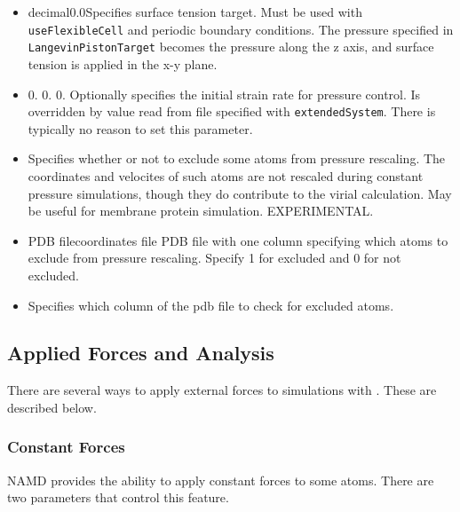 \begin{itemize}
\item
{}
{decimal}{0.0}{Specifies surface tension target.  Must be used with 
{\tt useFlexibleCell} and periodic boundary conditions.  The pressure 
specified in {\tt LangevinPistonTarget} becomes the pressure along the z
axis, and surface tension is applied in the x-y plane.}

\item
{}
{0. 0. 0.}
{Optionally specifies the initial strain rate for pressure control.
Is overridden by value read from file specified with {\tt extendedSystem}.
There is typically no reason to set this parameter.}

\item
{}
{Specifies whether or not to exclude some atoms from pressure rescaling.  The
coordinates and velocites of such atoms are not rescaled during constant
pressure simulations, though they do contribute to the virial calculation. 
May be useful for membrane protein simulation.  EXPERIMENTAL.}

\item
{}
{PDB file}{coordinates file}
{PDB file with one column specifying which atoms to exclude from pressure
rescaling.  Specify 1 for excluded and 0 for not excluded.}

\item
{}
{Specifies which column of the pdb file to check for excluded atoms.}

\end{itemize}

\subsection{Applied Forces and Analysis}

There are several ways to apply external forces to simulations with \NAMD.
These are described below.


\subsubsection{Constant Forces}

NAMD provides the ability to apply constant forces to some atoms.
There are two parameters that control this feature.

